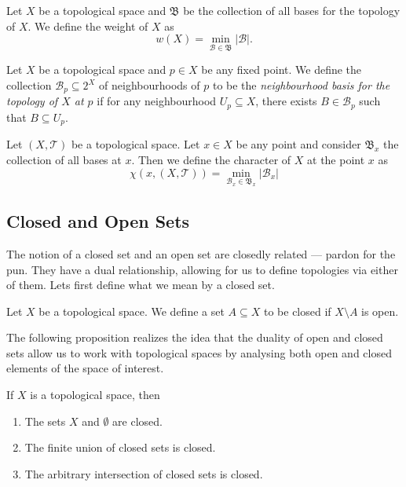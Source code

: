 \begin{definition}[Weight]\label{def: weight}
Let \(X\) be a topological space and \(\mathfrak B\) be the collection of
all bases for the topology of \(X\). We define the weight of \(X\) as
\[
  w(X) = \min_{\mathcal B \in \mathfrak B} |\mathcal B|.
\]
\end{definition}

\begin{definition}\label{def: basis at a point}
Let \(X\) be a topological space and \(p \in X\) be any fixed point. We define
the collection \(\mathcal B_p \subseteq 2^X\) of neighbourhoods of \(p\) to be
the \emph{neighbourhood basis for the topology of \(X\) at \(p\)} if for any
neighbourhood \(U_p \subseteq X\), there exists \(B \in \mathcal B_p\) such
that \(B \subseteq U_p\).
\end{definition}

\begin{definition}\label{def: character}
Let \((X, \mathcal T)\) be a topological space. Let \(x \in X\) be any point
and consider \(\mathfrak B_x\) the collection of all bases at \(x\). Then we
define the character of \(X\) at the point \(x\) as
\[
  \chi(x, (X, \mathcal T))
  = \min_{\mathcal B_x \in \mathfrak B_x} |\mathcal B_x|
\]
\end{definition}


\subsection{Closed and Open Sets}

The notion of a closed set and an open set are closedly related --- pardon for
the pun. They have a dual relationship, allowing for us to define topologies via
either of them. Lets first define what we mean by a closed set.

\begin{definition}\label{def:closed-set}
Let \(X\) be a topological space. We define a set \(A \subseteq X\) to be
closed if \(X \setminus A\) is open.
\end{definition}

The following proposition realizes the idea that the duality of open and closed
sets allow us to work with topological spaces by analysing both open and closed
elements of the space of interest.

\begin{proposition}\label{prop:equiv-closed-topology}
If \(X\) is a topological space, then
\begin{enumerate}\setlength\itemsep{0em}
\item The sets \(X\) and \(\emptyset\) are closed.

\item The finite union of closed sets is closed.

\item The arbitrary intersection of closed sets is closed.
\end{enumerate}
\end{proposition}


